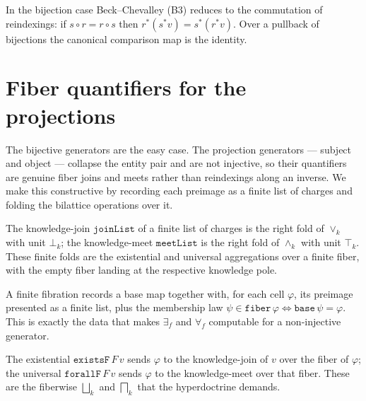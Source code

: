 \begin{theorem}\label{thm:beck-chevalley}\leanok{}
In the bijection case Beck--Chevalley (B3) reduces to the commutation of
reindexings: if $s\circ r = r\circ s$ then $r^{*}(s^{*}v) = s^{*}(r^{*}v)$. Over
a pullback of bijections the canonical comparison map is the identity.
\end{theorem}

\section{Fiber quantifiers for the projections}

The bijective generators are the easy case. The projection generators ---
subject and object --- collapse the entity pair and are not injective, so their
quantifiers are genuine fiber joins and meets rather than reindexings along an
inverse. We make this constructive by recording each preimage as a finite list of
charges and folding the bilattice operations over it.

\begin{definition}\label{def:charge-joinList}\leanok{}
The knowledge-join $\texttt{joinList}$ of a finite list of charges is the right
fold of $\vee_k$ with unit $\bot_k$; the knowledge-meet $\texttt{meetList}$ is the
right fold of $\wedge_k$ with unit $\top_k$. These finite folds are the
existential and universal aggregations over a finite fiber, with the empty fiber
landing at the respective knowledge pole.
\end{definition}

\begin{definition}\label{def:finiteFibration}\leanok{}
A finite fibration records a base map together with, for each cell $\varphi$, its
preimage presented as a finite list, plus the membership law $\psi \in
\texttt{fiber}\,\varphi \iff \texttt{base}\,\psi = \varphi$. This is exactly the
data that makes $\exists_{f}$ and $\forall_{f}$ computable for a non-injective
generator.
\end{definition}

\begin{definition}\label{def:existsF}\leanok{}
The existential $\texttt{existsF}\,F\,v$ sends $\varphi$ to the knowledge-join of
$v$ over the fiber of $\varphi$; the universal $\texttt{forallF}\,F\,v$ sends
$\varphi$ to the knowledge-meet over that fiber. These are the fiberwise
$\bigsqcup_k$ and $\bigsqcap_k$ that the hyperdoctrine demands.
\end{definition}

